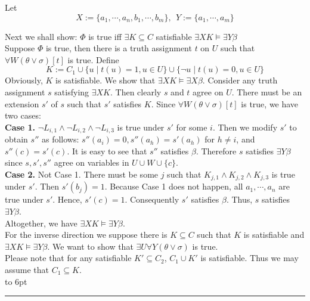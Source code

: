 \documentclass[12pt]{article}
\newenvironment{proof}{\parindent=0pt{\bf Proof: }}{
   \hspace*{\fill}\hbox to 6pt{\leaders\hrule width 6pt height 6pt\hfill}\par}
\begin{document}
\begin{proof}
Let
$$X:=\{a_1,\cdots, a_n, b_1,\cdots, b_m\}, \ \ Y:=\{a_1,\cdots, a_m\}$$


Next we shall show: $\Phi$ is true iff $\exists K\subseteq C$ satisfiable $\exists X K\models \exists Y\beta$\\

Suppose $\Phi$ is true, then there is a truth assignment $t$ on $U$ such that $\forall W(\theta\vee \sigma)[t]$ is true.
Define
$$K:=C_1\cup\{u\mid t(u)=1, u\in U\}\cup\{\neg u\mid t(u)=0, u\in U\}$$
Obviously, $K$ is satisfiable. We show that $\exists X K\models\exists X\beta$. Consider any truth assignment $s$ satisfying $\exists X K$. Then clearly $s$ and $t$ agree on $U$.
There must be an extension $s'$ of $s$ such that $s'$ satisfies $K$.  Since  $\forall W(\theta\vee \sigma)[t]$ is true, we have two cases:\\

{\bf Case 1.} $\neg L_{i,1}\wedge\neg L_{i,2}\wedge \neg L_{i,3}$ is true under $s'$ for some $i$. Then we modify $s'$ to obtain $s''$ as follows:
%
$s''(a_i)=0, s''(a_h)=s'(a_h)$ for $h\not=i$, and $s''(c)=s'(c)$. It is easy to see that $s''$ satisfies $\beta$. Therefore $s$ satisfies $\exists Y\beta$ since $s, s', s''$ agree on variables in $U\cup W\cup\{c\}$.\\

{\bf Case 2.} Not Case 1. There must be some $j$ such that $K_{j,1}\wedge K_{j,2}\wedge K_{j,3}$ is true under $s'$. Then $s'(b_j)=1$. Because Case 1 does not happen, all $a_1,\cdots,a_n$ are true under $s'$. Hence, $s'(c)=1$. Consequently $s'$ satisfies $\beta$. Thus, $s$ satisfies $\exists Y\beta$.\\


Altogether, we have $\exists X K\models \exists Y \beta$. \\


For the inverse direction we suppose there is $K\subseteq C$ such that $K$ is satisfiable and $\exists X K\models \exists Y \beta$.
We want to show that $\exists U\forall Y (\theta\vee \sigma)$ is true.\\

Please note that for any satisfiable $K'\subseteq C_2$, $C_1\cup K'$ is satisfiable. Thus we may assume that $C_1\subseteq K$.\\



\end{proof}
\end{document}

